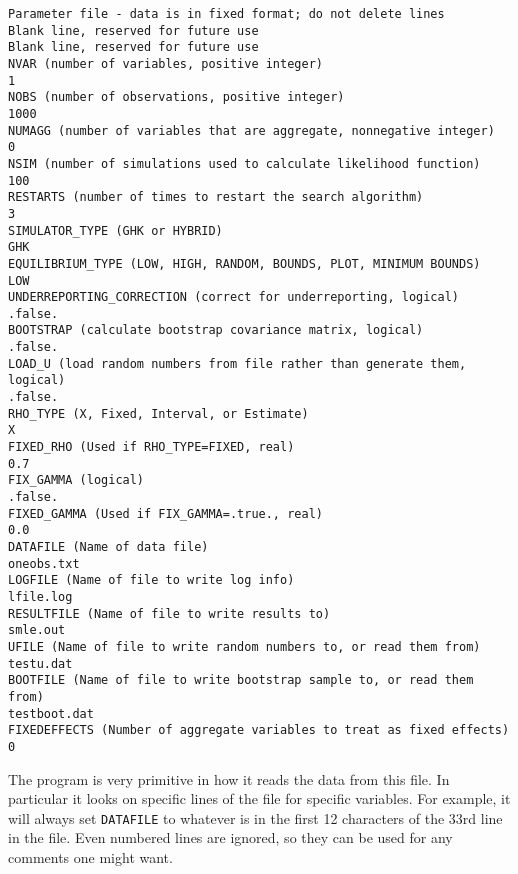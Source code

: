 \documentclass{article}
\begin{document}
{\scriptsize
\begin{verbatim}
Parameter file - data is in fixed format; do not delete lines
Blank line, reserved for future use
Blank line, reserved for future use
NVAR (number of variables, positive integer)
1 
NOBS (number of observations, positive integer)
1000
NUMAGG (number of variables that are aggregate, nonnegative integer)
0
NSIM (number of simulations used to calculate likelihood function)
100
RESTARTS (number of times to restart the search algorithm)
3
SIMULATOR_TYPE (GHK or HYBRID)
GHK
EQUILIBRIUM_TYPE (LOW, HIGH, RANDOM, BOUNDS, PLOT, MINIMUM BOUNDS)
LOW
UNDERREPORTING_CORRECTION (correct for underreporting, logical)
.false.
BOOTSTRAP (calculate bootstrap covariance matrix, logical)
.false.
LOAD_U (load random numbers from file rather than generate them, logical)
.false.
RHO_TYPE (X, Fixed, Interval, or Estimate)
X
FIXED_RHO (Used if RHO_TYPE=FIXED, real)
0.7
FIX_GAMMA (logical)
.false.
FIXED_GAMMA (Used if FIX_GAMMA=.true., real)
0.0
DATAFILE (Name of data file)
oneobs.txt
LOGFILE (Name of file to write log info)
lfile.log 
RESULTFILE (Name of file to write results to)
smle.out
UFILE (Name of file to write random numbers to, or read them from)
testu.dat
BOOTFILE (Name of file to write bootstrap sample to, or read them from)
testboot.dat
FIXEDEFFECTS (Number of aggregate variables to treat as fixed effects)
0
\end{verbatim}
}

The program is very primitive in how it reads the data from this file.  In 
particular it looks on specific lines of the file for specific 
variables.  For example, it will always set {\tt DATAFILE} to whatever is in the first 12
characters of the 33rd line in the file.  Even numbered
lines are ignored, so they can be used for any comments one might want.
\end{document}
